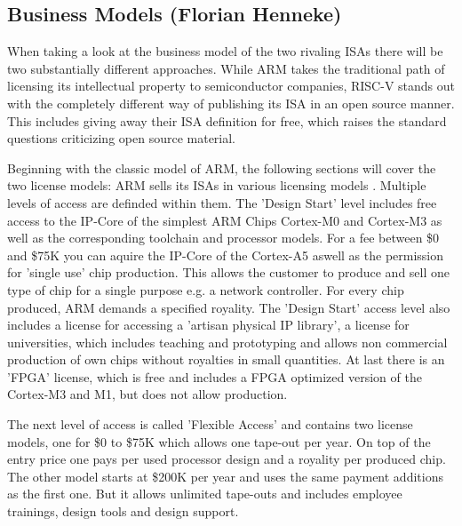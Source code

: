 \documentclass[conference]{IEEEtran}
\begin{document}
	\subsection{Business Models (Florian Henneke)}
	\label{businessModels}
	When taking a look at the business model of the two rivaling \glspl{ISA} there will be two substantially different approaches. While ARM takes the traditional path of licensing its intellectual property to semiconductor companies, RISC-V stands out with the completely different way of publishing its \gls{ISA} in an open source manner. This includes giving away their \gls{ISA} definition for free, which raises the standard questions criticizing open source material. %

	Beginning with the classic model of ARM, the following sections will cover the two license models: ARM sells its \glspl{ISA} in various licensing models \cite{ARMLC}. Multiple levels of access are definded within them. The 'Design Start' level includes free access to the IP-Core of the simplest ARM Chips Cortex-M0 and Cortex-M3 as well as the corresponding toolchain and processor models. For a fee between \$0 and \$75K \cite{ARMLC} you can aquire the IP-Core of the Cortex-A5 aswell as the permission for 'single use' chip production. This allows the customer to produce and sell one type of chip for a single purpose e.g. a network controller. For every chip produced, ARM demands a specified royality. The 'Design Start' access level also includes a license for accessing a 'artisan physical IP library', a license for universities, which includes teaching and prototyping and allows non commercial production of own chips without royalties in small quantities. At last there is an '\acrshort{FPGA}' license, which is free and includes a \gls{FPGA} optimized version of the Cortex-M3 and M1, but does not allow production.

	The next level of access is called 'Flexible Access' and contains two license models, one for \$0 to \$75K which allows one tape-out per year. On top of the entry price one pays per used processor design and a royality per produced chip. The other model starts at \$200K per year and uses the same payment additions as the first one. But it allows unlimited tape-outs and includes employee trainings, design tools and design support. \cite{ARMLC}
\end{document}
